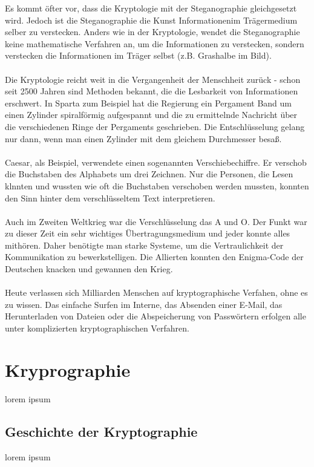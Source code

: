 \documentclass[12pt,a4paper]{report}
\begin{document}
Es kommt öfter vor, dass die Kryptologie mit der Steganographie gleichgesetzt wird. Jedoch ist die Steganographie die Kunst Informationenim Trägermedium selber zu verstecken. Anders wie in der Kryptologie, wendet die Steganographie keine mathematische Verfahren an, um die Informationen zu verstecken, sondern verstecken die Informationen im Träger selbst (z.B. Grashalbe im Bild).\\\\

Die Kryptologie reicht weit in die Vergangenheit der Menschheit zurück - schon seit 2500 Jahren sind Methoden bekannt, die die Lesbarkeit von Informationen erschwert. In Sparta zum Beispiel hat die Regierung ein Pergament Band um einen Zylinder spiralförmig aufgespannt und die zu ermittelnde Nachricht über die verschiedenen Ringe der Pergaments geschrieben. Die Entschlüsselung gelang nur dann, wenn man einen Zylinder mit dem gleichem Durchmesser besaß.\\\\

Caesar, als Beispiel, verwendete einen sogenannten Verschiebechiffre. Er verschob die Buchstaben des Alphabets um drei Zeichnen. Nur die Personen, die Lesen klnnten und wussten wie oft die Buchstaben verschoben werden mussten, konnten den Sinn hinter dem verschlüsseltem Text interpretieren.\\\\

Auch im Zweiten Weltkrieg war die Verschlüsselung das A und O. Der Funkt war zu dieser Zeit ein sehr wichtiges Übertragungsmedium und jeder konnte alles mithören. Daher benötigte man starke Systeme, um die Vertraulichkeit der Kommunikation zu bewerkstelligen. Die Allierten konnten den Enigma-Code der Deutschen knacken und gewannen den Krieg.\\\\

Heute verlassen sich Milliarden Menschen auf kryptographische Verfahen, ohne es zu wissen. Das einfache Surfen im Interne, das Absenden einer E-Mail, das Herunterladen von Dateien oder die Abspeicherung von Passwörtern erfolgen alle unter komplizierten kryptographischen Verfahren.

\section{Kryprographie}
lorem ipsum
\subsection{Geschichte der Kryptographie}
lorem ipsum
\end{document}
